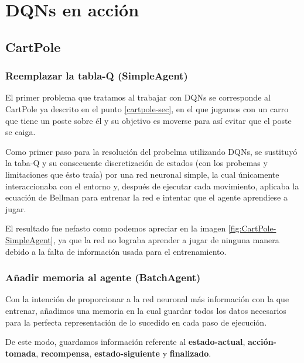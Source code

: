 \chapter{DQNs en acción}
\label{cap:dqnEnAccion}


\section{CartPole}
\label{sec:cartpoleDQN}

\subsection{Reemplazar la tabla-Q (SimpleAgent)}

El primer problema que tratamos al trabajar con DQNs se corresponde al CartPole ya descrito en el punto \ref{cartpole-sec}, en el que jugamos con un carro que tiene un poste sobre él y su objetivo es moverse para así evitar que el poste se caiga.

Como primer paso para la resolución del probelma utilizando DQNs, se sustituyó la taba-Q y su consecuente discretización de estados (con los probemas y limitaciones que ésto traía) por una red neuronal simple, la cual únicamente interaccionaba con el entorno y, después de ejecutar cada movimiento, aplicaba la ecuación de Bellman para entrenar la red e intentar que el agente aprendiese a jugar.

El resultado fue nefasto como podemos apreciar en la imagen \ref{fig:CartPole-SimpleAgent}, ya que la red no lograba aprender a jugar de ninguna manera debido a la falta de información usada para el entrenamiento.


\subsection{Añadir memoria al agente (BatchAgent)}

Con la intención de proporcionar a la red neuronal más información con la que entrenar, añadimos una memoria en la cual guardar todos los datos necesarios para la perfecta representación de lo sucedido en cada paso de ejecución.

De este modo, guardamos información referente al \textbf{estado-actual}, \textbf{acción-tomada}, \textbf{recompensa}, \textbf{estado-siguiente} y \textbf{finalizado}.

